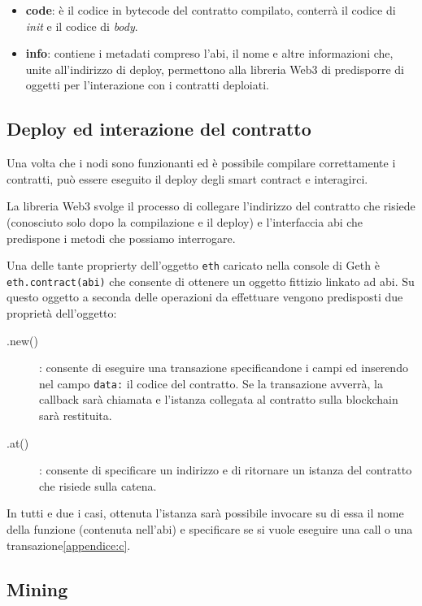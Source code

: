 \begin{appendices}
		\begin{itemize}
			\item \textbf{code}: è il codice in bytecode del contratto compilato, conterrà il codice di \textit{init} e il codice di \textit{body}.
			\item \textbf{info}: contiene i metadati compreso l'abi, il nome e altre informazioni che, unite all'indirizzo di deploy, permettono alla libreria Web3 di predisporre di oggetti per l'interazione con i contratti deploiati.
		\end{itemize}
		
		\subsection{Deploy ed interazione del contratto}
		
		Una volta che i nodi sono funzionanti ed è possibile compilare correttamente i contratti, può essere eseguito il deploy degli smart contract e interagirci.
		
		La libreria Web3 svolge il processo di collegare l'indirizzo del contratto che risiede (conosciuto solo dopo la compilazione e il deploy)  e l'interfaccia abi che predispone i metodi che possiamo interrogare.
		
		Una delle tante proprierty dell'oggetto \lstinline|eth| caricato nella console di Geth è \lstinline|eth.contract(abi)| che consente di ottenere un oggetto fittizio linkato ad abi. Su questo oggetto a seconda delle operazioni da effettuare vengono predisposti due proprietà dell'oggetto:
		\begin{description}
			\item[.new()]: consente di eseguire una transazione specificandone i campi ed inserendo nel campo \lstinline|data:| il codice del contratto. Se la transazione avverrà, la callback sarà chiamata e l'istanza collegata al contratto sulla blockchain sarà restituita.
			\item[.at()]: consente di specificare un indirizzo e di ritornare un istanza del contratto che risiede sulla catena. 
		\end{description}
		
		In tutti e due i casi, ottenuta l'istanza sarà possibile invocare su di essa il nome della funzione (contenuta nell'abi) e specificare se si vuole eseguire una call o una transazione\ref{appendice:c}.

		
		\subsection{Mining}
		

\end{appendices}
